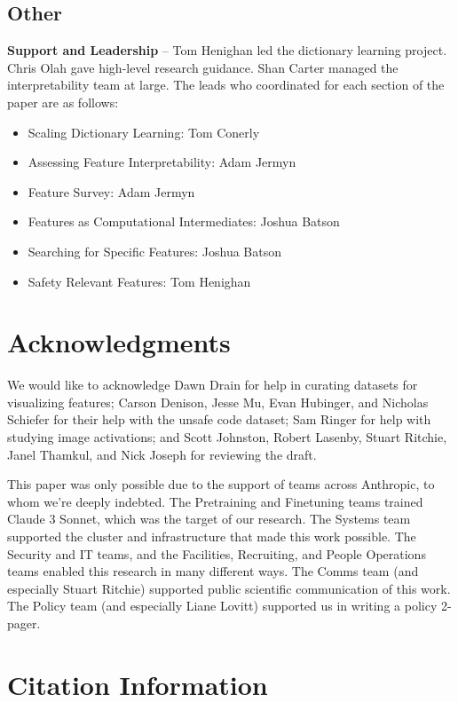 \documentclass{article}
\let\oldsection\section
\renewcommand{\section}{\FloatBarrier\oldsection}
\let\oldsubsection\subsection
\renewcommand{\subsection}{\FloatBarrier\oldsubsection}
\begin{document}
\subsection{Other}

\textbf{Support and Leadership} -- Tom Henighan led the dictionary learning project. Chris Olah gave high-level research guidance. Shan Carter managed the interpretability team at large. The leads who coordinated for each section of the paper are as follows:

\begin{itemize}
    \item Scaling Dictionary Learning: Tom Conerly
    \item Assessing Feature Interpretability: Adam Jermyn
    \item Feature Survey: Adam Jermyn
    \item Features as Computational Intermediates: Joshua Batson
    \item Searching for Specific Features: Joshua Batson
    \item Safety Relevant Features: Tom Henighan
\end{itemize}

\section{Acknowledgments}\label{sec:appendix-acknowledgments}

We would like to acknowledge Dawn Drain for help in curating datasets for visualizing features; Carson Denison, Jesse Mu, Evan Hubinger, and Nicholas Schiefer for their help with the unsafe code dataset; Sam Ringer for help with studying image activations; and Scott Johnston, Robert Lasenby, Stuart Ritchie, Janel Thamkul, and Nick Joseph for reviewing the draft.

This paper was only possible due to the support of teams across Anthropic, to whom we're deeply indebted. The Pretraining and Finetuning teams trained Claude 3 Sonnet, which was the target of our research. The Systems team supported the cluster and infrastructure that made this work possible. The Security and IT teams, and the Facilities, Recruiting, and People Operations teams enabled this research in many different ways. The Comms team (and especially Stuart Ritchie) supported public scientific communication of this work. The Policy team (and especially Liane Lovitt) supported us in writing a policy 2-pager.

\section{Citation Information}\label{sec:appendix-citation}
\end{document}
